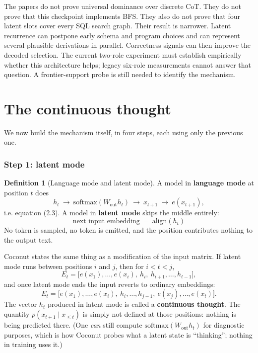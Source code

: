 \documentclass[11pt]{article}
\theoremstyle{definition}
\newtheorem{definition}[theorem]{Definition}
\begin{document}
The papers do not prove universal dominance over discrete CoT. They do not prove that this checkpoint implements BFS. They also do not prove that four latent slots cover every SQL search graph. Their result is narrower. Latent recurrence can postpone early schema and program choices and can represent several plausible derivations in parallel. Correctness signals can then improve the decoded selection. The current two-role experiment must establish empirically whether this architecture helps; legacy six-role measurements cannot answer that question. A frontier-support probe is still needed to identify the mechanism.

\newpage
\part{The continuous thought}
\label{part:coconut}

We now build the mechanism itself, in four steps, each using only the previous one.

\section{Step 1: latent mode}

\begin{definition}[Language mode and latent mode]
A model in \textbf{language mode} at position $t$ does
\[
h_t \ \to\ \mathrm{softmax}(W_{\mathrm{out}}h_t)\ \to\ x_{t+1}\ \to\ e(x_{t+1}),
\]
i.e. equation (2.3). A model in \textbf{latent mode} skips the middle entirely:
\[
\boxed{\ \text{next input embedding} \ =\ \mathrm{align}(h_t)\ }
\tag{4.1}
\]
No token is sampled, no token is emitted, and the position contributes nothing to the output text.
\end{definition}

Coconut states the same thing as a modification of the input matrix. If latent mode runs between positions $i$ and $j$, then for $i < t < j$,
\[
E_t = \big[e(x_1),\dots,e(x_i),\ h_i,\ h_{i+1},\dots,h_{t-1}\big],
\]
and once latent mode ends the input reverts to ordinary embeddings:
\[
E_t = \big[e(x_1),\dots,e(x_i),\ h_i,\dots,h_{j-1},\ e(x_j),\dots,e(x_t)\big].
\]
The vector $h_t$ produced in latent mode is called a \textbf{continuous thought}. The quantity $p(x_{t+1}\mid x_{\le t})$ is simply not defined at those positions: nothing is being predicted there. (One \emph{can} still compute $\mathrm{softmax}(W_{\mathrm{out}}h_t)$ for diagnostic purposes, which is how Coconut probes what a latent state is ``thinking''; nothing in training uses it.)
\end{document}

